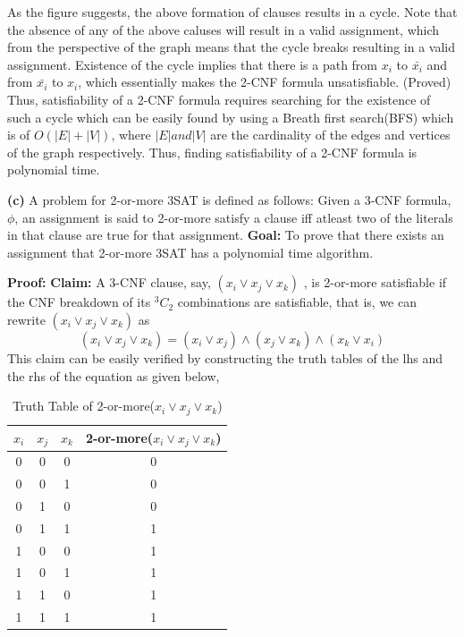 \documentclass{article}
\renewcommand\part[1]{\vspace{.10in}\textbf{(#1)}}
\begin{document}
 As the figure suggests, the above formation of clauses results in a cycle. Note that the absence of any of the above caluses will result in a valid assignment, which from the perspective of the graph means that the cycle breaks resulting in a valid assignment. Existence of the cycle implies that there is a path from $x_{i}$ to $\bar{x_{i}}$ and from $\bar{x_{i}}$ to $x_{i}$, which essentially makes the 2-CNF formula unsatisfiable. (Proved)
Thus, satisfiability of a 2-CNF formula requires searching for the existence of such a cycle which can be easily found by using a Breath first search(BFS) which is of $O(|E|+|V|)$, where $|E| and |V|$ are the cardinality of the edges and vertices of the graph respectively. Thus, finding satisfiability of a 2-CNF formula is polynomial time.\newline

\part{c} A problem for 2-or-more  3SAT is defined as follows: Given a 3-CNF formula, $\phi$, an assignment is said to 2-or-more satisfy a clause iff atleast two of the literals in that clause are true for that assignment. \textbf {Goal:} To prove that there exists an assignment that 2-or-more 3SAT has a polynomial time algorithm. \newline

\textbf{Proof:} \newline
\textbf{Claim:} A 3-CNF clause, say, $(x_{i} \vee x_{j} \vee x_{k})$ , is 2-or-more satisfiable if the CNF breakdown of its $^3C_{2}$ combinations are satisfiable, that is, we can rewrite $(x_{i} \vee x_{j} \vee x_{k})$ as \newline
\begin{equation}
	(x_{i} \vee x_{j} \vee x_{k}) = (x_{i} \vee x_{j}) \wedge (x_{j} \vee x_{k}) \wedge (x_{k} \vee x_{i})
\end{equation}
This claim can be easily verified by constructing the truth tables of the lhs and the rhs of the equation as given below, \newline
\begin{table}[ht]
  \caption{Truth Table of 2-or-more($x_{i} \vee x_{j} \vee x_{k}$)}
  \centering
  \begin{tabular}{c c c c}
  \hline\hline
   $x_{i}$ & $x_{j}$ & $x_{k}$ & 2-or-more($x_{i} \vee x_{j} \vee x_{k}$) \\[0.5ex]
  \hline
  0 & 0 & 0 & 0 \\
  0 & 0 & 1 & 0 \\
  0 & 1 & 0 & 0 \\
  0 & 1 & 1 & 1 \\
  1 & 0 & 0 & 1 \\
  1 & 0 & 1 & 1 \\
  1 & 1 & 0 & 1 \\
  1 & 1 & 1 & 1 \\
  \end{tabular}
  \label{table:nonlin}
  \end{table}	  
\end{document}
